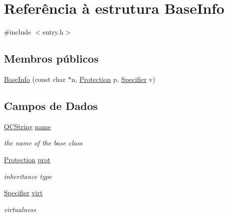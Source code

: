 \hypertarget{struct_base_info}{\section{Referência à estrutura Base\-Info}
\label{struct_base_info}
}


{\ttfamily \#include $<$entry.\-h$>$}

\subsection*{Membros públicos}
\begin{DoxyCompactItemize}
\item 
\hyperlink{struct_base_info_a3987140908f98e6f53512507d79ecdbd}{Base\-Info} (const char $\ast$n, \hyperlink{types_8h_a90e352184df58cd09455fe9996cd4ded}{Protection} p, \hyperlink{types_8h_ab16236bdd10ddf4d73a9847350f0017e}{Specifier} v)
\end{DoxyCompactItemize}
\subsection*{Campos de Dados}
\begin{DoxyCompactItemize}
\item 
\hypertarget{struct_base_info_adc0097c7bd1e61ad32058fcde425bc7a}{\hyperlink{class_q_c_string}{Q\-C\-String} \hyperlink{struct_base_info_adc0097c7bd1e61ad32058fcde425bc7a}{name}}\label{struct_base_info_adc0097c7bd1e61ad32058fcde425bc7a}

\begin{DoxyCompactList}\small\item\em the name of the base class \end{DoxyCompactList}\item 
\hypertarget{struct_base_info_a3f887065f93ce5f02dea21da35468e8e}{\hyperlink{types_8h_a90e352184df58cd09455fe9996cd4ded}{Protection} \hyperlink{struct_base_info_a3f887065f93ce5f02dea21da35468e8e}{prot}}\label{struct_base_info_a3f887065f93ce5f02dea21da35468e8e}

\begin{DoxyCompactList}\small\item\em inheritance type \end{DoxyCompactList}\item 
\hypertarget{struct_base_info_aa05b4729c780621416429c6aac10fccf}{\hyperlink{types_8h_ab16236bdd10ddf4d73a9847350f0017e}{Specifier} \hyperlink{struct_base_info_aa05b4729c780621416429c6aac10fccf}{virt}}\label{struct_base_info_aa05b4729c780621416429c6aac10fccf}

\begin{DoxyCompactList}\small\item\em virtualness \end{DoxyCompactList}\end{DoxyCompactItemize}


